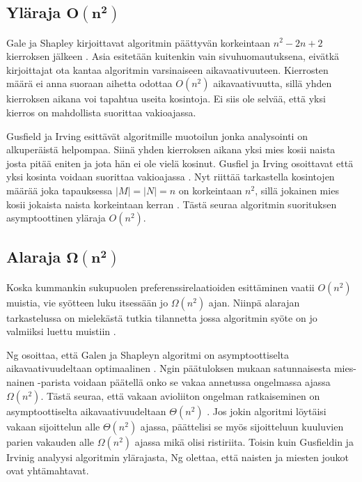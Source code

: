 \documentclass[gradu, twoside]{tktltiki}
\begin{document}
\subsection{Yläraja $\boldsymbol{O(n^2)}$}

Gale ja Shapley kirjoittavat algoritmin päättyvän korkeintaan $n^2 -
2n + 2$ kierroksen jälkeen \cite{galeshapley62}. Asia esitetään
kuitenkin vain sivuhuomautuksena, eivätkä kirjoittajat ota kantaa
algoritmin varsinaiseen aikavaativuuteen. Kierrosten määrä ei anna
suoraan aihetta odottaa $O(n^2)$ aikavaativuutta, sillä yhden
kierroksen aikana voi tapahtua useita kosintoja. Ei siis ole selvää,
että yksi kierros on mahdollista suorittaa vakioajassa.

Gusfield ja Irving esittävät algoritmille muotoilun \cite{gusfield89}
jonka analysointi on alkuperäistä helpompaa. Siinä yhden kierroksen
aikana yksi mies kosii naista josta pitää eniten ja jota hän ei ole
vielä kosinut. Gusfiel ja Irving osoittavat että yksi kosinta voidaan
suorittaa vakioajassa \cite{gusfield89}. Nyt riittää tarkastella
kosintojen määrää joka tapauksessa $|M| = |N| = n$ on korkeintaan
$n^2$, sillä jokainen mies kosii jokaista naista korkeintaan kerran
\cite{gusfield89}. Tästä seuraa algoritmin suorituksen asymptoottinen
yläraja $O(n^2)$.

\subsection{Alaraja $\boldsymbol{\Omega(n^2)}$}

Koska kummankin sukupuolen preferenssirelaatioiden esittäminen vaatii
$O(n^2)$ muistia, vie syötteen luku itsessään jo $\Omega(n^2)$ ajan.
Niinpä alarajan tarkastelussa on mielekästä tutkia tilannetta jossa
algoritmin syöte on jo valmiiksi luettu muistiin \cite{cheng89}.

Ng osoittaa, että Galen ja Shapleyn algoritmi on asymptoottiselta
aikavaativuudeltaan optimaalinen \cite{cheng89}. Ngin päätuloksen
mukaan satunnaisesta mies-nainen -parista voidaan päätellä onko se
vakaa annetussa ongelmassa ajassa $\Omega(n^2)$. Tästä seuraa, että
vakaan avioliiton ongelman ratkaiseminen on asymptoottiselta
aikavaativuudeltaan $\Theta(n^2)$ \cite{cheng89}. Jos jokin algoritmi
löytäisi vakaan sijoittelun alle $\Theta(n^2)$ ajassa, päättelisi se
myös sijoitteluun kuuluvien parien vakauden alle $\Omega(n^2)$ ajassa
mikä olisi ristiriita. Toisin kuin Gusfieldin ja Irvinig analyysi
algoritmin ylärajasta, Ng olettaa, että naisten ja miesten joukot ovat
yhtämahtavat.
\end{document}
